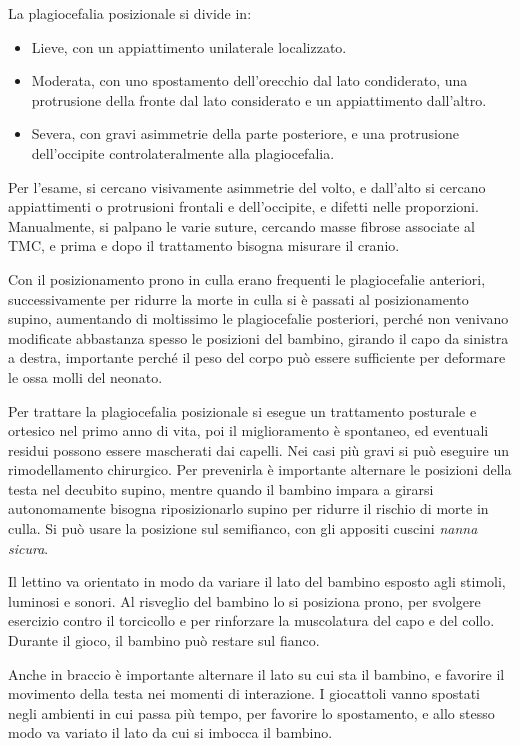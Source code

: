 La plagiocefalia posizionale si divide in:
\begin{itemize}
\item Lieve, con un appiattimento unilaterale localizzato.
\item Moderata, con uno spostamento dell'orecchio dal lato condiderato, una protrusione della fronte dal lato considerato e un
appiattimento dall'altro.
\item Severa, con gravi asimmetrie della parte posteriore, e una protrusione dell'occipite controlateralmente alla plagiocefalia.
\end{itemize}

Per l'esame, si cercano visivamente asimmetrie del volto, e dall'alto si cercano appiattimenti o protrusioni frontali e dell'occipite, e
difetti nelle proporzioni.
Manualmente, si palpano le varie suture, cercando masse fibrose associate al TMC, e prima e dopo il trattamento bisogna misurare il
cranio.

Con il posizionamento prono in culla erano frequenti le plagiocefalie anteriori, successivamente per ridurre la morte in culla si è
passati al posizionamento supino, aumentando di moltissimo le plagiocefalie posteriori, perché non venivano modificate abbastanza spesso
le posizioni del bambino, girando il capo da sinistra a destra, importante perché il peso del corpo può essere sufficiente per deformare
le ossa molli del neonato.

Per trattare la plagiocefalia posizionale si esegue un trattamento posturale e ortesico nel primo anno di vita, poi il miglioramento è
spontaneo, ed eventuali residui possono essere mascherati dai capelli. Nei casi più gravi si può eseguire un rimodellamento chirurgico.
Per prevenirla è importante alternare le posizioni della testa nel decubito supino, mentre quando il bambino impara a girarsi
autonomamente bisogna riposizionarlo supino per ridurre il rischio di morte in culla. Si può usare la posizione sul semifianco, con gli
appositi cuscini \textit{nanna sicura}.

Il lettino va orientato in modo da variare il lato del bambino esposto agli stimoli, luminosi e sonori. Al risveglio del bambino lo si
posiziona prono, per svolgere esercizio contro il torcicollo e per rinforzare la muscolatura del capo e del collo. Durante il gioco, il
bambino può restare sul fianco.

Anche in braccio è importante alternare il lato su cui sta il bambino, e favorire il movimento della testa nei momenti di interazione. I
giocattoli vanno spostati negli ambienti in cui passa più tempo, per favorire lo spostamento, e allo stesso modo va variato il lato da
cui si imbocca il bambino.

